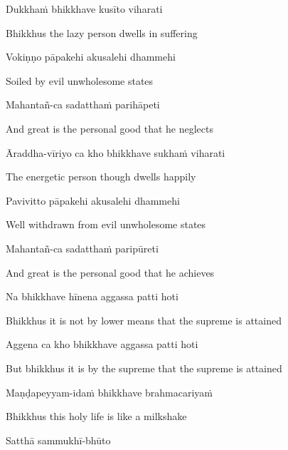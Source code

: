 Dukkhaṁ bhikkhave kusīto viharati

\begin{cprenglish}
  Bhikkhus the lazy person dwells in suffering
\end{cprenglish}

Vokiṇṇo pāpakehi akusalehi dhammehi

\begin{cprenglish}
  Soiled by evil unwholesome states
\end{cprenglish}

Mahantañ-ca sadatthaṁ parihāpeti

\begin{cprenglish}
  And great is the personal good that he neglects
\end{cprenglish}

Āraddha-vīriyo ca kho bhikkhave sukhaṁ viharati

\begin{cprenglish}
  The energetic person though dwells happily
\end{cprenglish}

Pavivitto pāpakehi akusalehi dhammehi

\begin{cprenglish}
  Well withdrawn from evil unwholesome states
\end{cprenglish}

Mahantañ-ca sadatthaṁ paripūreti

\begin{cprenglish}
  And great is the personal good that he achieves
\end{cprenglish}

Na bhikkhave hīnena aggassa patti hoti

\begin{cprenglish}
  Bhikkhus it is not by lower means that the supreme is attained
\end{cprenglish}

Aggena ca kho bhikkhave aggassa patti hoti

\begin{cprenglish}
  But bhikkhus it is by the supreme that the supreme is attained
\end{cprenglish}

Maṇḍapeyyam-idaṁ bhikkhave brahmacariyaṁ

\begin{cprenglish}
  Bhikkhus this holy life is like a milkshake
\end{cprenglish}

Satthā sammukhī-bhūto

